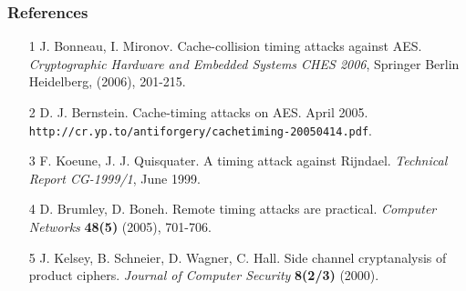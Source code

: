 \documentclass[9pt,handout]{beamer}
\begin{document}
\begin{frame}
	\frametitle{References}
	\begin{itemize}
		\item [1] J. Bonneau, I. Mironov. Cache-collision timing attacks against AES. \emph{Cryptographic Hardware and Embedded Systems CHES 2006}, Springer Berlin Heidelberg, (2006), 201-215.
		\item [2] D. J. Bernstein. Cache-timing attacks on AES. April 2005. 
		{\tt http://cr.yp.to/antiforgery/cachetiming-20050414.pdf}.
		\item [3] F. Koeune, J. J. Quisquater. A timing attack against Rijndael. \emph{Technical Report CG-1999/1}, June 1999.
		\item [4] D. Brumley, D. Boneh. Remote timing attacks are practical. \emph{Computer Networks} \textbf{48(5)} (2005), 701-706.
		\item [5] J. Kelsey, B. Schneier, D. Wagner, C. Hall. Side channel cryptanalysis of product ciphers. \emph{Journal of Computer Security} \textbf{8(2/3)} (2000). 
	\end{itemize}
\end{frame}	

\end{document}
